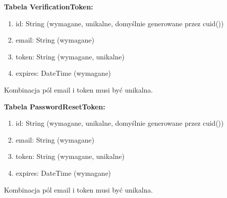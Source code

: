 \documentclass[12pt]{article}
\begin{document}
\noindent\hspace{0.6cm}\textbf{\large Tabela VerificationToken:}\vspace{-10pt}
\begin{enumerate}[label=\textbullet, leftmargin=1.2cm, itemsep=-6pt]
	\item id: String (wymagane, unikalne, domyślnie generowane przez cuid())
	\item email: String (wymagane)
	\item token: String (wymagane, unikalne)
	\item expires: DateTime (wymagane)
\end{enumerate}
\vspace{-10pt}
\begin{adjustwidth}{0.5cm}{0pt}
	Kombinacja pól email i token musi być unikalna.
\end{adjustwidth}
\vspace{10pt}

\noindent\hspace{0.6cm}\textbf{\large Tabela PasswordResetToken:}\vspace{-10pt}
\begin{enumerate}[label=\textbullet, leftmargin=1.2cm, itemsep=-6pt]
	\item id: String (wymagane, unikalne, domyślnie generowane przez cuid())
	\item email: String (wymagane)
	\item token: String (wymagane, unikalne)
	\item expires: DateTime (wymagane)
\end{enumerate}
\vspace{-10pt}
\begin{adjustwidth}{0.5cm}{0pt}
	Kombinacja pól email i token musi być unikalna.
\end{adjustwidth}
\vspace{10pt}
\end{document}
